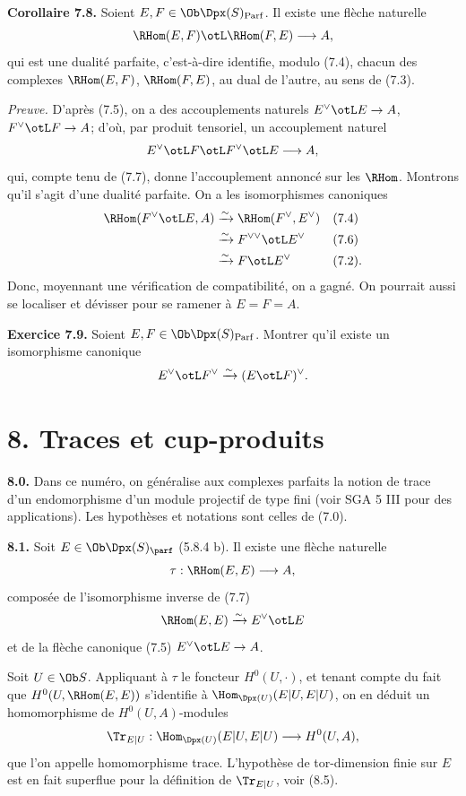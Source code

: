 \documentclass[11pt]{article}
\newcommand{\Parf}{\operatorname{Parf}}
\begin{document}
\textbf{Corollaire 7.8.} Soient \(E,F\in\Ob\Dpx(S)_{\Parf}\). Il existe une flèche naturelle
\[
  \RHom(E,F)\otL\RHom(F,E)\longrightarrow A,
\]
qui est une dualité parfaite, c'est-à-dire identifie, modulo (7.4), chacun des complexes \(\RHom(E,F)\), \(\RHom(F,E)\), au dual de l'autre, au sens de (7.3).

\emph{Preuve.} D'après (7.5), on a des accouplements naturels \(E^\vee\otL E\to A\), \(F^\vee\otL F\to A\); d'où, par produit tensoriel, un accouplement naturel
\[
  E^\vee\otL F\otL F^\vee\otL E\longrightarrow A,
\]
qui, compte tenu de (7.7), donne l'accouplement annoncé sur les \(\RHom\). Montrons qu'il s'agit d'une dualité parfaite. On a les isomorphismes canoniques
\[
\begin{aligned}
\RHom(F^\vee\otL E,A)&\xrightarrow{\sim}\RHom(F^\vee,E^\vee) &&(7.4)\\
&\xrightarrow{\sim}F^{\vee\vee}\otL E^\vee &&(7.6)\\
&\xrightarrow{\sim}F\otL E^\vee &&(7.2).
\end{aligned}
\]
Donc, moyennant une vérification de compatibilité, on a gagné. On pourrait aussi se localiser et dévisser pour se ramener à \(E=F=A\).


\textbf{Exercice 7.9.} Soient \(E,F\in\Ob\Dpx(S)_{\Parf}\). Montrer qu'il existe un isomorphisme canonique
\[
  E^\vee\otL F^\vee \xrightarrow{\sim} (E\otL F)^\vee .
\]

\section*{8. Traces et cup-produits}

\textbf{8.0.} Dans ce numéro, on généralise aux complexes parfaits la notion de trace d'un endomorphisme d'un module projectif de type fini (voir SGA 5 III pour des applications). Les hypothèses et notations sont celles de (7.0).

\textbf{8.1.} Soit \(E\in\Ob\Dpx(S)_{\parf}\) (5.8.4 b). Il existe une flèche naturelle
\[
  \tau:\RHom(E,E)\longrightarrow A,
\]
composée de l'isomorphisme inverse de (7.7)
\[
  \RHom(E,E)\xrightarrow{\sim}E^\vee\otL E
\]
et de la flèche canonique (7.5) \(E^\vee\otL E\to A\).

Soit \(U\in\Ob S\). Appliquant à \(\tau\) le foncteur \(H^0(U,\cdot)\), et tenant compte du fait que \(H^0(U,\RHom(E,E))\) s'identifie à \(\Hom_{\Dpx(U)}(E|U,E|U)\), on en déduit un homomorphisme de \(H^0(U,A)\)-modules
\[
  \Tr_{E|U}:\Hom_{\Dpx(U)}(E|U,E|U)\longrightarrow H^0(U,A),
\]
que l'on appelle homomorphisme trace. L'hypothèse de tor-dimension finie sur \(E\) est en fait superflue pour la définition de \(\Tr_{E|U}\), voir (8.5).
\end{document}
